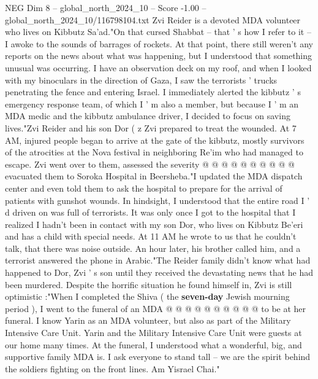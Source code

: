 \begin{textsample}{NEG Dim 8 – global\_north\_2024\_10 – Score -1.00 – global\_north\_2024\_10/116798104.txt}  \label{ex:f8_neg_198}
Zvi Reider is a devoted MDA volunteer who lives on Kibbutz Sa'ad."On that cursed Shabbat -- that ' s how I refer to it -- I awoke to the sounds of barrages of rockets.
At that point, there still weren't any reports on the news about what was happening, but I understood that something unusual was occurring.
I have an observation deck on my roof, and when I looked with my binoculars in the direction of Gaza, I saw the terrorists ' trucks penetrating the fence and entering Israel.
I immediately alerted the kibbutz ' s emergency response team, of which I ' m also a member, but because I ' m an MDA medic and the kibbutz ambulance driver, I decided to focus on saving lives."Zvi Reider and his son Dor ( z Zvi prepared to treat the wounded.
At 7 AM, injured people began to arrive at the gate of the kibbutz, mostly survivors of the atrocities at the Nova festival in neighboring Re'im who had managed to escape.
Zvi went over to them, assessed the severity @ @ @ @ @ @ @ @ @ @ evacuated them to Soroka Hospital in Beersheba."I updated the MDA dispatch center and even told them to ask the hospital to prepare for the arrival of patients with gunshot wounds.
In hindsight, I understood that the entire road I ' d driven on was full of terrorists.
It was only once I got to the hospital that I realized I hadn't been in contact with my son Dor, who lives on Kibbutz Be'eri and has a child with special needs.
At 11 AM he wrote to us that he couldn't talk, that there was noise outside.
An hour later, his brother called him, and a terrorist answered the phone in Arabic."The Reider family didn't know what had happened to Dor, Zvi ' s son until they received the devastating news that he had been murdered.
Despite the horrific situation he found himself in, Zvi is still optimistic :"When I completed the Shiva ( the \textbf{seven-day} Jewish mourning period ), I went to the funeral of an MDA @ @ @ @ @ @ @ @ @ @ to be at her funeral.
I know Yarin as an MDA volunteer, but also as part of the Military Intensive Care Unit.
Yarin and the Military Intensive Care Unit were guests at our home many times.
At the funeral, I understood what a wonderful, big, and supportive family MDA is.
I ask everyone to stand tall -- we are the spirit behind the soldiers fighting on the front lines.
Am Yisrael Chai."

\end{textsample}
